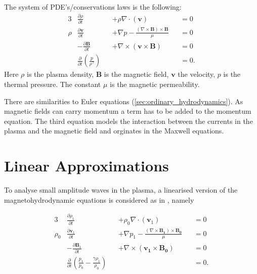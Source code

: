 \documentclass[a4paper]{article}
\begin{document}
The system of PDE's/conservations laws is the following:
\begin{alignat}{3}
    &\frac{\partial \rho}{\partial t} &&+ \rho \nabla  \cdot (\mathbf v) &&= 0 \tag{mass}\label{eq:mass}\\
    \rho&\frac{\partial \mathbf v}{\partial t} &&+  \nabla p - \frac{(\nabla \times \mathbf{B}) \times \mathbf{B}}{\mu} &&= 0 \tag{moment}\label{eq:cauchymoment}\\
    &-\frac{\partial \mathbf B}{\partial t} &&+ \nabla \times (\mathbf{v} \times \mathbf{B}) &&= 0 \tag{charge}\label{eq:faraday}\\
    &\frac{\partial}{\partial t}\left(\frac{p}{\rho^\gamma}\right) && &&= 0 \tag{energy}\label{eq:energy}.
\end{alignat} 
Here $\rho$ is the plasma density, $\mathbf B$ is the magnetic field,  $\mathbf v$ the velocity, $p$ is the thermal pressure. The constant $\mu$ is the magnetic permeability. 

There are similarities to Euler equations (\cref{sec:ordinary_hydrodynamics}).
As magnetic fields can carry momentum \cite[section 8.2]{GriffithsDavidJeffery2017Ite} a term has to be added to the momentum equation. 
The third equation models the interaction between the currents in the plasma and the magnetic field and orginates in the Maxwell equations.

\section{Linear Approximations} \label{sec:linear_approximations}

To analyse small amplitude waves in the plasma, a linearised version of the magnetohydrodynamic equations is considered as in \cite{Fitzpatricknotes}, namely

\begin{alignat}{3}
    &\frac{\partial \rho_1}{\partial t} &&+ \rho_0 \nabla  \cdot (\mathbf v_1) &&= 0 \tag{mass}\label{eq:masslin}\\
    \rho_0&\frac{\partial \mathbf v_1}{\partial t} &&+  \nabla p_1 - \frac{(\nabla \times \mathbf{B_1}) \times \mathbf{B_0}}{\mu} &&= 0 \tag{moment}\label{eq:cauchymomentlin}\\
    &-\frac{\partial \mathbf B_1}{\partial t} &&+ \nabla \times (\mathbf{v_1} \times \mathbf{B_0}) &&= 0 \tag{charge}\label{eq:faradaylin}\\
    &\frac{\partial}{\partial t}(\frac{p_1}{p_0} - \frac{\gamma\rho_1}{\rho_0}) && &&= 0 \tag{energy}\label{eq:energylin}.
\end{alignat}
\end{document}
